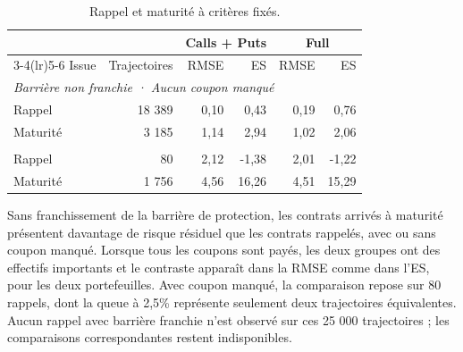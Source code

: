 \documentclass[12pt,a4paper]{article}
\newcommand{\1}{\mathbf{1}}
\begin{document}
\begin{table}[H]
\centering
\small
\setlength{\tabcolsep}{4pt}
\begin{tabular}{lrrrrr}
\toprule
 & & \multicolumn{2}{c}{Calls + Puts} & \multicolumn{2}{c}{Full} \\
\cmidrule(lr){3-4}\cmidrule(lr){5-6}
Issue & Trajectoires & RMSE & ES & RMSE & ES \\
\midrule
\multicolumn{6}{l}{\textit{Barrière non franchie · Aucun coupon manqué}} \\
\addlinespace[2pt]
Rappel & 18 389 & 0,10 & 0,43 & 0,19 & 0,76 \\
Maturité & 3 185 & 1,14 & 2,94 & 1,02 & 2,06 \\
\addlinespace[4pt]
\multicolumn{6}{l}{\textit{Barrière non franchie · Coupon manqué}} \\
\addlinespace[2pt]
Rappel & 80 & 2,12 & -1,38 & 2,01 & -1,22 \\
Maturité & 1 756 & 4,56 & 16,26 & 4,51 & 15,29 \\
\bottomrule
\end{tabular}

\caption{Rappel et maturité à critères fixés.}
\label{tab:tail-contract-counts}
\end{table}

Sans franchissement de la barrière de protection, les contrats arrivés à maturité présentent davantage de risque résiduel que les contrats rappelés, avec ou sans coupon manqué. Lorsque tous les coupons sont payés, les deux groupes ont des effectifs importants et le contraste apparaît dans la RMSE comme dans l’ES, pour les deux portefeuilles. Avec coupon manqué, la comparaison repose sur 80 rappels, dont la queue à 2,5\% représente seulement deux trajectoires équivalentes. Aucun rappel avec barrière franchie n’est observé sur ces 25 000 trajectoires ; les comparaisons correspondantes restent indisponibles.
\end{document}

